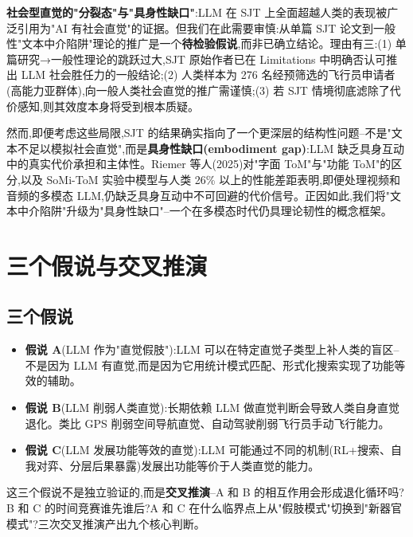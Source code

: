 \documentclass[11pt,a4paper]{article}
\begin{document}
\textbf{社会型直觉的"分裂态"与"具身性缺口"}:LLM 在 SJT 上全面超越人类的表现被广泛引用为"AI 有社会直觉"的证据\cite{sjt2024}。但我们在此需要审慎:从单篇 SJT 论文到一般性"文本中介陷阱"理论的推广是一个\textbf{待检验假说},而非已确立结论。理由有三:(1) 单篇研究→一般性理论的跳跃过大,SJT 原始作者已在 Limitations 中明确否认可推出 LLM 社会胜任力的一般结论;(2) 人类样本为 276 名经预筛选的飞行员申请者(高能力亚群体),向一般人类社会直觉的推广需谨慎;(3) 若 SJT 情境彻底滤除了代价感知,则其效度本身将受到根本质疑。

然而,即便考虑这些局限,SJT 的结果确实指向了一个更深层的结构性问题--不是"文本不足以模拟社会直觉",而是\textbf{具身性缺口(embodiment gap)}:LLM 缺乏具身互动中的真实代价承担和主体性。Riemer 等人(2025)对"字面 ToM"与"功能 ToM"的区分,以及 SoMi-ToM 实验中模型与人类 26\% 以上的性能差距表明,即便处理视频和音频的多模态 LLM,仍缺乏具身互动中不可回避的代价信号。正因如此,我们将"文本中介陷阱"升级为"具身性缺口"--一个在多模态时代仍具理论韧性的概念框架。

\section{三个假说与交叉推演}

\subsection{三个假说}

\begin{itemize}
  \item \textbf{假说 A}(LLM 作为"直觉假肢"):LLM 可以在特定直觉子类型上补人类的盲区--不是因为 LLM 有直觉,而是因为它用统计模式匹配、形式化搜索实现了功能等效的辅助。
  \item \textbf{假说 B}(LLM 削弱人类直觉):长期依赖 LLM 做直觉判断会导致人类自身直觉退化\cite{bainbridge1983ironies,vallor2015moral}。类比 GPS 削弱空间导航直觉、自动驾驶削弱飞行员手动飞行能力。
  \item \textbf{假说 C}(LLM 发展功能等效的直觉):LLM 可能通过不同的机制(RL+搜索、自我对弈、分层后果暴露)发展出功能等价于人类直觉的能力。
\end{itemize}

这三个假说不是独立验证的,而是\textbf{交叉推演}--A 和 B 的相互作用会形成退化循环吗?B 和 C 的时间竞赛谁先谁后?A 和 C 在什么临界点上从"假肢模式"切换到"新器官模式"?三次交叉推演产出九个核心判断。
\end{document}
